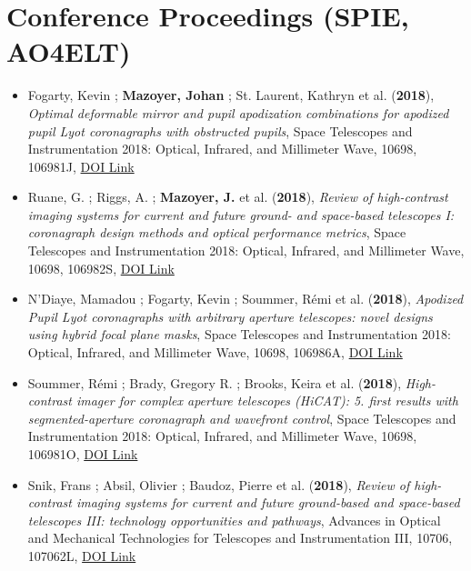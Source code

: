 \documentclass[11pt]{article}
\begin{document}
\section*{Conference Proceedings (SPIE, AO4ELT)}

\begin{itemize}\itemsep 0pt


\item Fogarty, Kevin ; {\bf Mazoyer, Johan} ; St. Laurent, Kathryn et al. ({\bf2018}), {\it Optimal deformable mirror and pupil apodization combinations for apodized pupil Lyot coronagraphs with obstructed pupils}, Space Telescopes and Instrumentation 2018: Optical, Infrared, and Millimeter Wave, 10698, 106981J, \href{https://doi.org/10.1117/12.2314394}{DOI Link}

\item Ruane, G. ; Riggs, A. ; {\bf Mazoyer, J.} et al. ({\bf2018}), {\it Review of high-contrast imaging systems for current and future ground- and space-based telescopes I: coronagraph design methods and optical performance metrics}, Space Telescopes and Instrumentation 2018: Optical, Infrared, and Millimeter Wave, 10698, 106982S, \href{https://doi.org/10.1117/12.2312948}{DOI Link}

\item N'Diaye, Mamadou ; Fogarty, Kevin ; Soummer, R{\'e}mi et al. ({\bf2018}), {\it Apodized Pupil Lyot coronagraphs with arbitrary aperture telescopes: novel designs using hybrid focal plane masks}, Space Telescopes and Instrumentation 2018: Optical, Infrared, and Millimeter Wave, 10698, 106986A, \href{https://doi.org/10.1117/12.2313225}{DOI Link}

\item Soummer, R{\'e}mi ; Brady, Gregory R. ; Brooks, Keira et al. ({\bf2018}), {\it High-contrast imager for complex aperture telescopes (HiCAT): 5. first results with segmented-aperture coronagraph and wavefront control}, Space Telescopes and Instrumentation 2018: Optical, Infrared, and Millimeter Wave, 10698, 106981O, \href{https://doi.org/10.1117/12.2314110}{DOI Link}

\item Snik, Frans ; Absil, Olivier ; Baudoz, Pierre et al. ({\bf2018}), {\it Review of high-contrast imaging systems for current and future ground-based and space-based telescopes III: technology opportunities and pathways}, Advances in Optical and Mechanical Technologies for Telescopes and Instrumentation III, 10706, 107062L, \href{https://doi.org/10.1117/12.2313957}{DOI Link}


\end{itemize}
\end{document}
